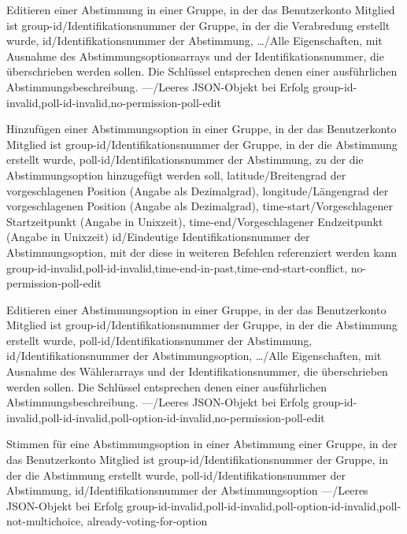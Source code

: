 \documentclass[parskip=full,11pt]{scrartcl}
\begin{document}
{Editieren einer Abstimmung in einer Gruppe, in der das Benutzerkonto Mitglied
ist}
{group-id/Identifikationsnummer der Gruppe{,} in der die Verabredung erstellt
wurde,
id/Identifikationsnummer der Abstimmung,
\dots/Alle Eigenschaften{,} mit Ausnahme des Abstimmungsoptionsarrays und der
Identifikationsnummer{,} die überschrieben werden sollen.
Die Schlüssel entsprechen denen einer ausführlichen Abstimmungsbeschreibung.}
{---/Leeres JSON-Objekt bei Erfolg}
{group-id-invalid,poll-id-invalid,no-permission-poll-edit}

{Hinzufügen einer Abstimmungsoption in einer Gruppe, in der das Benutzerkonto
Mitglied ist}
{group-id/Identifikationsnummer der Gruppe{,} in der die Abstimmung erstellt
wurde,
poll-id/Identifikationsnummer der Abstimmung{,} zu der die Abstimmungsoption
hinzugefügt werden soll,
latitude/Breitengrad der vorgeschlagenen Position (Angabe als Dezimalgrad),
longitude/Längengrad der vorgeschlagenen Position (Angabe als Dezimalgrad),
time-start/Vorgeschlagener Startzeitpunkt (Angabe in Unixzeit),
time-end/Vorgeschlagener Endzeitpunkt (Angabe in Unixzeit)}
{id/Eindeutige Identifikationsnummer der Abstimmungsoption{,} mit der diese in
weiteren Befehlen referenziert werden kann}
{group-id-invalid,poll-id-invalid,time-end-in-past,time-end-start-conflict,
no-permission-poll-edit}

{Editieren einer Abstimmungsoption in einer Gruppe, in der das Benutzerkonto
Mitglied ist}
{group-id/Identifikationsnummer der Gruppe{,} in der die Abstimmung erstellt
wurde,
poll-id/Identifikationsnummer der Abstimmung,
id/Identifikationsnummer der Abstimmungsoption,
\dots/Alle Eigenschaften{,} mit Ausnahme des Wählerarrays und der
Identifikationsnummer{,} die überschrieben werden sollen.
Die Schlüssel entsprechen denen einer ausführlichen Abstimmungsbeschreibung.}
{---/Leeres JSON-Objekt bei Erfolg}
{group-id-invalid,poll-id-invalid,poll-option-id-invalid,no-permission-poll-edit}

{Stimmen für eine Abstimmungsoption in einer Abstimmung einer Gruppe,
in der das Benutzerkonto Mitglied ist}
{group-id/Identifikationsnummer der Gruppe{,} in der die Abstimmung erstellt
wurde,
poll-id/Identifikationsnummer der Abstimmung,
id/Identifikationsnummer der Abstimmungsoption}
{---/Leeres JSON-Objekt bei Erfolg}
{group-id-invalid,poll-id-invalid,poll-option-id-invalid,poll-not-multichoice,
already-voting-for-option}
\end{document}
